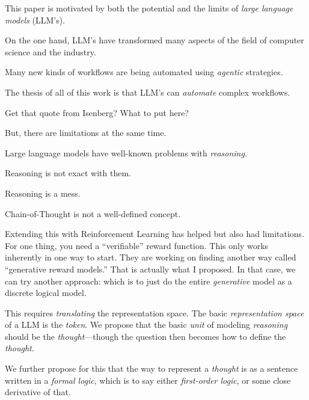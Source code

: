 \label{sec:contributions}

This paper is motivated by both the potential and the limits of {\em large language models} (LLM's).

On the one hand, LLM's have transformed many aspects of the field of computer science and the industry.

Many new kinds of workflows are being automated using {\em agentic} strategies.

The thesis of all of this work is that LLM's can {\em automate} complex workflows.

Get that quote from Isenberg? What to put here?

But, there are limitations at the same time.

Large language models have well-known problems with {\em reasoning}.

Reasoning is not exact with them.

Reasoning is a mess.

Chain-of-Thought is not a well-defined concept.

Extending this with Reinforcement Learning has helped but also had limitations.
For one thing, you need a ``verifiable'' reward function.
This only works inherently in one way to start.
They are working on finding another way called ``generative reward models.''
That is actually what I proposed.
In that case, we can try another approach: which is to just do the entire {\em generative} model as a discrete logical model.

This requires {\em translating} the representation space.
The basic {\em representation space} of a LLM is the {\em token}.
We propose that the basic {\em unit} of modeling {\em reasoning} should be the {\em thought}---though the question then becomes how to define the {\em thought}.

We further propose for this that the way to represent a {\em thought} is as a sentence written in a {\em formal logic}, which is to say either {\em first-order logic}, or some close derivative of that.